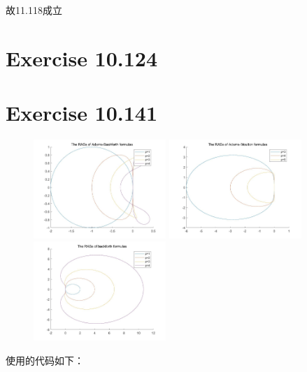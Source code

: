 \documentclass[twoside,a4paper]{article}
\begin{document}
  故11.118成立


  \section{Exercise 10.124}

  \section{Exercise 10.141}
  
\begin{figure}[H]
    \centering
    \begin{minipage}[t]{0.3\textwidth}
    \centering
    \includegraphics[width=5cm]{./pic/Adams-Bashforth.jpg}
    \end{minipage}
    \begin{minipage}[t]{0.3\textwidth}
    \centering
    \includegraphics[width=5cm]{./pic/Adams-Moulton.jpg}
    \end{minipage}
    \begin{minipage}[t]{0.3\textwidth}
    \centering
    \includegraphics[width=5cm]{./pic/backforth.jpg}
    \end{minipage}
\end{figure}
使用的代码如下：
\end{document}
